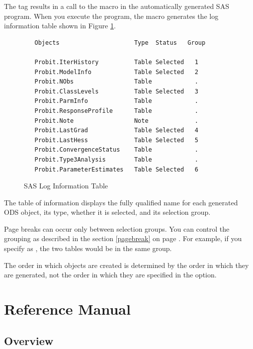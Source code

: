 \documentclass[article,oneside]{memoir}
\begin{document}
The  tag results in a call to the  macro in the
automatically generated SAS program. When you execute the program,
the  macro generates the log information table shown in
Figure \ref{loginfo}.

\begin{figure}[H]
\begin{snugshade}
\begin{verbatim}
   Objects                     Type  Status   Group

   Probit.IterHistory          Table Selected   1
   Probit.ModelInfo            Table Selected   2
   Probit.NObs                 Table            .
   Probit.ClassLevels          Table Selected   3
   Probit.ParmInfo             Table            .
   Probit.ResponseProfile      Table            .
   Probit.Note                 Note             .
   Probit.LastGrad             Table Selected   4
   Probit.LastHess             Table Selected   5
   Probit.ConvergenceStatus    Table            .
   Probit.Type3Analysis        Table            .
   Probit.ParameterEstimates   Table Selected   6
\end{verbatim}
\end{snugshade}
\caption{SAS Log Information Table}\label{loginfo}
\end{figure}

  The table of information displays the fully qualified name for each
  generated ODS object, its type, whether it is selected, and its
  selection group.

  Page breaks can occur only between
  selection groups. You can control the grouping
  as described in the section \ref{pagebreak} on page \pageref{pagebreak}.
  For example, if you specify
 as ,
  the two tables would be in the same group.

  The order in which objects are created is determined by the
  order in which they are generated, not the order in which they are
  specified in the  option.

\part{Reference Manual}
\chapter{Overview}
\end{document}
